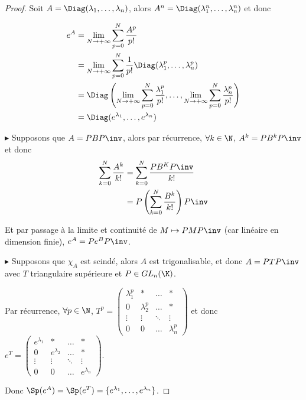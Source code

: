 \begin{proof}
    Soit $A = \Diag(\lambda_1, \dots, \lambda_n)$, alors $A^n = \Diag (\lambda_1^n, \dots, \lambda_n^n)$ et donc

    \begin{align}
        e^A & = \lim_{N \to + \infty} \sum_{p = 0}^{N} \frac{A^p}{p!} \\
        & = \lim_{N \to + \infty} \sum_{p = 0}^{N} \frac{1}{p!} \Diag (\lambda_1^p, \dots, \lambda_n^p) \\
        & = \Diag \left( \lim_{N \to + \infty} \sum_{p = 0}^{N} \frac{\lambda_1^p}{p!}, \dots, \lim_{N \to + \infty} \sum_{p = 0}^{N} \frac{\lambda_n^p}{p!} \right) \\
        & = \Diag (e^{\lambda_1}, \dots, e^{\lambda_n})
    \end{align}

    \lvspace $\blacktriangleright$ Supposons que $A = PBP\inv$, alors par récurrence, 
    $\forall k \in \N$, $A^k = P B^k P\inv$ et donc
    \begin{align}
        \sum_{k = 0}^N \frac{A^k}{k!} & = \sum_{k = 0}^{N} \frac{PB^KP\inv}{k!} \\
        & = P \left( \sum_{k = 0}^{N} \frac{B^k}{k!} \right) P\inv
    \end{align}

    Et par passage à la limite et continuité de $M \mapsto PMP\inv$ (car linéaire en 
    dimension finie), $e^A = P e^B P\inv$.

    \lvspace $\blacktriangleright$ Supposons que $\chi_A$ est scindé, alors 
    $A$ est trigonalisable, et donc $A = PTP\inv$ avec $T$ triangulaire supérieure et $P \in GL_n(\K)$.

    Par récurrence, $\forall p \in \N$, $T^p = \begin{pmatrix}
    \lambda_1^p & * & \dots & * \\
    0 & \lambda_2^p & \dots & * \\
    \vdots & \vdots & \ddots & \vdots \\
    0 & 0 & \dots & \lambda_n^p
    \end{pmatrix}$ et donc $e^T = \begin{pmatrix}
    e^{\lambda_1} & * & \dots & * \\
    0 & e^{\lambda_2} & \dots & * \\
    \vdots & \vdots & \ddots & \vdots \\
    0 & 0 & \dots & e^{\lambda_n}
    \end{pmatrix}$.

    Donc $\Sp(e^A) = \Sp(e^T) = \{e^{\lambda_1}, \dots, e^{\lambda_n}\}$.
\end{proof}


